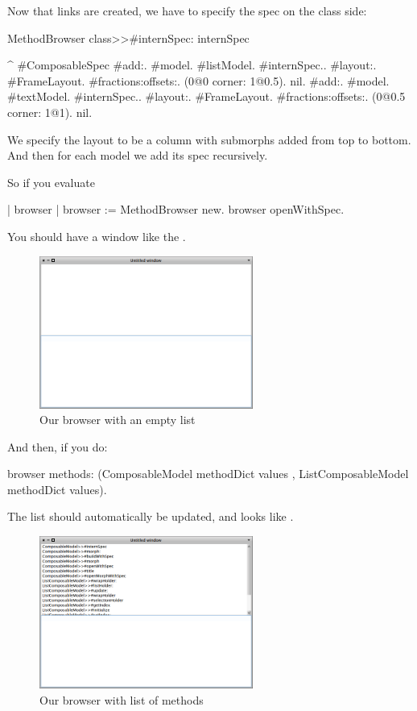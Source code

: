 \documentclass[a4paper,10pt,twoside]{book}
\begin{document}
Now that links are created, we have to specify the spec on the class side:

\begin{method}{MethodBrowser class>>\#internSpec:}
internSpec

	^{ #ComposableSpec
			#add:. {{#model. #listModel. #internSpec.}.
						#layout:. {#FrameLayout.
									#fractions:offsets:. (0@0 corner: 1@0.5). nil}}.
			#add:. {{#model. #textModel. #internSpec.}.
						#layout:. {#FrameLayout.
									#fractions:offsets:. (0@0.5 corner: 1@1). nil}}}.
\end{method}
%
We specify the layout to be a column with submorphs added from top to bottom. And then for each model we add its spec recursively.

So if you evaluate
%
\begin{code}{}
| browser |
browser := MethodBrowser new.
browser openWithSpec.
\end{code}
You should have a window like the .
\begin{figure}[ht]
\begin{center}
	\includegraphics[width=7cm]{MethodBrowser1}
	\caption{Our browser with an empty list}
\end{center}
\end{figure}

And then, if you do:
%
\begin{code}{}
browser  methods: (ComposableModel methodDict values , ListComposableModel methodDict values).
\end{code}
The list should automatically be updated, and looks like .
\begin{figure}[ht]
\begin{center}
	\includegraphics[width=7cm]{MethodBrowser2}
	\caption{Our browser with list of methods}
\end{center}
\end{figure}
\end{document}
